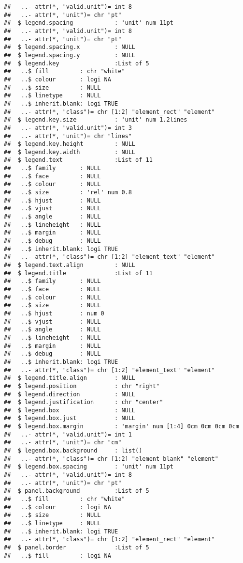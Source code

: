\documentclass[]{article}
\begin{document}
\begin{verbatim}
##   ..- attr(*, "valid.unit")= int 8
##   ..- attr(*, "unit")= chr "pt"
##  $ legend.spacing            : 'unit' num 11pt
##   ..- attr(*, "valid.unit")= int 8
##   ..- attr(*, "unit")= chr "pt"
##  $ legend.spacing.x          : NULL
##  $ legend.spacing.y          : NULL
##  $ legend.key                :List of 5
##   ..$ fill         : chr "white"
##   ..$ colour       : logi NA
##   ..$ size         : NULL
##   ..$ linetype     : NULL
##   ..$ inherit.blank: logi TRUE
##   ..- attr(*, "class")= chr [1:2] "element_rect" "element"
##  $ legend.key.size           : 'unit' num 1.2lines
##   ..- attr(*, "valid.unit")= int 3
##   ..- attr(*, "unit")= chr "lines"
##  $ legend.key.height         : NULL
##  $ legend.key.width          : NULL
##  $ legend.text               :List of 11
##   ..$ family       : NULL
##   ..$ face         : NULL
##   ..$ colour       : NULL
##   ..$ size         : 'rel' num 0.8
##   ..$ hjust        : NULL
##   ..$ vjust        : NULL
##   ..$ angle        : NULL
##   ..$ lineheight   : NULL
##   ..$ margin       : NULL
##   ..$ debug        : NULL
##   ..$ inherit.blank: logi TRUE
##   ..- attr(*, "class")= chr [1:2] "element_text" "element"
##  $ legend.text.align         : NULL
##  $ legend.title              :List of 11
##   ..$ family       : NULL
##   ..$ face         : NULL
##   ..$ colour       : NULL
##   ..$ size         : NULL
##   ..$ hjust        : num 0
##   ..$ vjust        : NULL
##   ..$ angle        : NULL
##   ..$ lineheight   : NULL
##   ..$ margin       : NULL
##   ..$ debug        : NULL
##   ..$ inherit.blank: logi TRUE
##   ..- attr(*, "class")= chr [1:2] "element_text" "element"
##  $ legend.title.align        : NULL
##  $ legend.position           : chr "right"
##  $ legend.direction          : NULL
##  $ legend.justification      : chr "center"
##  $ legend.box                : NULL
##  $ legend.box.just           : NULL
##  $ legend.box.margin         : 'margin' num [1:4] 0cm 0cm 0cm 0cm
##   ..- attr(*, "valid.unit")= int 1
##   ..- attr(*, "unit")= chr "cm"
##  $ legend.box.background     : list()
##   ..- attr(*, "class")= chr [1:2] "element_blank" "element"
##  $ legend.box.spacing        : 'unit' num 11pt
##   ..- attr(*, "valid.unit")= int 8
##   ..- attr(*, "unit")= chr "pt"
##  $ panel.background          :List of 5
##   ..$ fill         : chr "white"
##   ..$ colour       : logi NA
##   ..$ size         : NULL
##   ..$ linetype     : NULL
##   ..$ inherit.blank: logi TRUE
##   ..- attr(*, "class")= chr [1:2] "element_rect" "element"
##  $ panel.border              :List of 5
##   ..$ fill         : logi NA

\end{verbatim}
\end{document}
